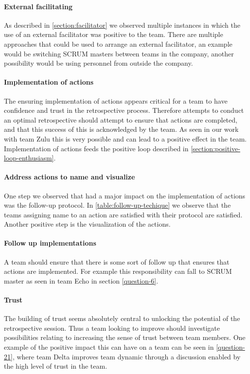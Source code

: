 \paragraph{External facilitating}
As described in \autoref{section:facilitator} we observed multiple instances in which the use of an external facilitator was positive to the team. There are multiple approaches that could be used to arrange an external facilitator, an example would be switching SCRUM masters between teams in the company, another possibility would be using personnel from outside the company.

\paragraph{Implementation of actions}
The ensuring implementation of actions appears critical for a team to have confidence and trust in the retrospective process. Therefore attempts to conduct an optimal retrospective should attempt to ensure that actions are completed, and that this success of this is acknowledged by the team. As seen in our work with team Zulu this is very possible and can lead to a positive effect in the team. Implementation of actions feeds the positive loop described in \autoref{section:positive-loop-enthusiasm}.

\paragraph{Address actions to name and visualize}
One step we observed that had a major impact on the implementation of actions was the follow-up protocol. In \autoref{table:follow-up-techique} we observe that the teams assigning name to an action are satisfied with their protocol are satisfied. Another positive step is the visualization of the actions.


\paragraph{Follow up implementations}
A team should ensure that there is some sort of follow up that ensures that actions are implemented. For example this responsibility can fall to SCRUM master as seen in team Echo in section \autoref{question-6}.

\paragraph{Trust}
The building of trust seems absolutely central to unlocking the potential of the retrospective session. Thus a team looking to improve should investigate possibilities relating to increasing the sense of trust between team members. One example of the positive impact this can have on a team can be seen in \autoref{question-21}, where team Delta improves team dynamic through a discussion enabled by the high level of trust in the team.

